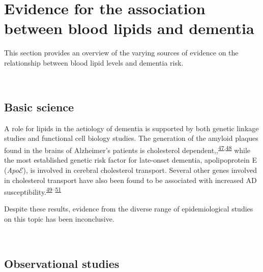 \documentclass[a4paper, twoside]{templates/ociamthesis}
\begin{document}
~

\hypertarget{evidence-association}{%
\section{Evidence for the association between blood lipids and dementia}\label{evidence-association}}

This section provides an overview of the varying sources of evidence on the relationship between blood lipid levels and dementia risk.

~

\hypertarget{intro-basic-science}{%
\subsection{Basic science}\label{intro-basic-science}}

A role for lipids in the aetiology of dementia is supported by both genetic linkage studies and functional cell biology studies. The generation of the amyloid plaques found in the brains of Alzheimer's patients is cholesterol dependent,,\textsuperscript{\protect\hyperlink{ref-burns2003}{47},\protect\hyperlink{ref-mizuno1999}{48}} while the most established genetic risk factor for late-onset dementia, apolipoprotein E (\emph{Apo}\(\mathcal{E}\)), is involved in cerebral cholesterol transport. Several other genes involved in cholesterol transport have also been found to be associated with increased AD susceptibility.\textsuperscript{\protect\hyperlink{ref-beecham2014}{49}--\protect\hyperlink{ref-meng2007}{51}}

Despite these results, evidence from the diverse range of epidemiological studies on this topic has been inconclusive.

~

\hypertarget{observational-studies}{%
\subsection{Observational studies}\label{observational-studies}}
\end{document}
